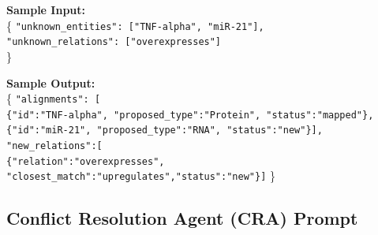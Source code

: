 \documentclass{article}
\begin{document}
\begin{tcolorbox}[colframe=black!25, colback=black!5, boxrule=0.5pt, arc=2pt]
\vspace{1mm}
\noindent
\textbf{Sample Input:}\\
\{
  \texttt{"unknown\_entities": ["TNF-alpha", "miR-21"],}\\
  \texttt{"unknown\_relations": ["overexpresses"]}\\
\}

\vspace{1mm}
\noindent
\textbf{Sample Output:}\\
\{
  \texttt{"alignments": [}\\
  \quad \texttt{\{"id":"TNF-alpha", "proposed\_type":"Protein", "status":"mapped"\},}\\
  \quad \texttt{\{"id":"miR-21", "proposed\_type":"RNA", "status":"new"\}],}\\
  \texttt{"new\_relations":[\\ \{"relation":"overexpresses", "closest\_match":"upregulates","status":"new"\}]}
\}
\end{tcolorbox}
\newpage

\subsection{Conflict Resolution Agent (CRA) Prompt}
\label{appendix:cra_prompt}
\end{document}
